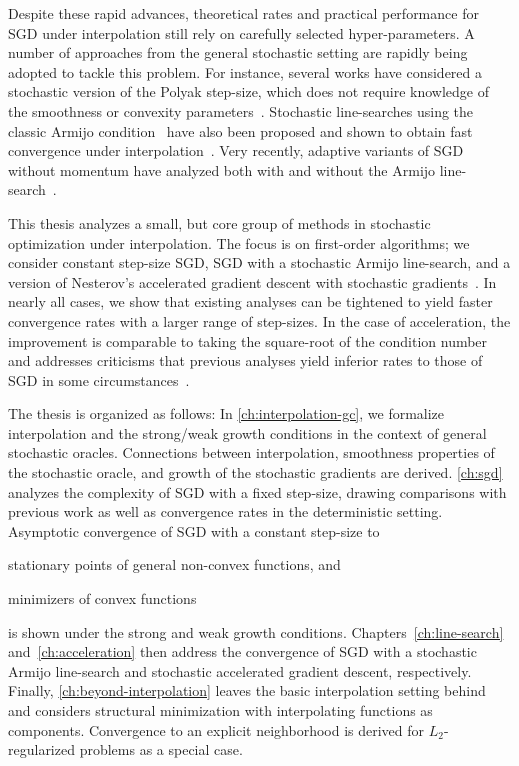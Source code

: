 Despite these rapid advances, theoretical rates and practical performance for \ac{SGD} under interpolation still rely on carefully selected hyper-parameters.
A number of approaches from the general stochastic setting are rapidly being adopted to tackle this problem.
For instance, several works have considered a stochastic version of the Polyak step-size, which does not require knowledge of the smoothness or convexity parameters~\citep{loizou2020sps, berrada2019training}. 
Stochastic line-searches using the classic Armijo condition~\citep{armijo1966ls} have also been proposed and shown to obtain fast convergence under interpolation~\citep{vaswani2019painless}.
Very recently, adaptive variants of \ac{SGD} without momentum have analyzed both with and without the Armijo line-search~\citep{vaswani2020adaptive}.

This thesis analyzes a small, but core group of methods in stochastic optimization under interpolation.
The focus is on first-order algorithms; we consider constant step-size \ac{SGD}, \ac{SGD} with a stochastic Armijo line-search, and a version of Nesterov's accelerated gradient descent with stochastic gradients~\citep{nesterov2004lectures}. 
In nearly all cases, we show that existing analyses can be tightened to yield faster convergence rates with a larger range of step-sizes. 
In the case of acceleration, the improvement is comparable to taking the square-root of the condition number and addresses criticisms that previous analyses yield inferior rates to those of \ac{SGD} in some circumstances~\citep{liu2020accelerating}. 

The thesis is organized as follows: 
In \autoref{ch:interpolation-gc}, we formalize interpolation and the strong/weak growth conditions in the context of general stochastic oracles. 
Connections between interpolation, smoothness properties of the stochastic oracle, and growth of the stochastic gradients are derived.
\autoref{ch:sgd} analyzes the complexity of \ac{SGD} with a fixed step-size, drawing comparisons with previous work as well as convergence rates in the deterministic setting. 
Asymptotic convergence of SGD with a constant step-size to
\begin{inparaenum}[(i)]
\item stationary points of general non-convex functions, and
\item minimizers of convex functions 
\end{inparaenum}
is shown under the strong and weak growth conditions.
Chapters~\ref{ch:line-search} and~\ref{ch:acceleration} then address the convergence of \ac{SGD} with a stochastic Armijo line-search and stochastic accelerated gradient descent, respectively. 
Finally, \autoref{ch:beyond-interpolation} leaves the basic interpolation setting behind and considers structural minimization with interpolating functions as components. 
Convergence to an explicit neighborhood is derived for \( L_2 \)-regularized problems as a special case. 


